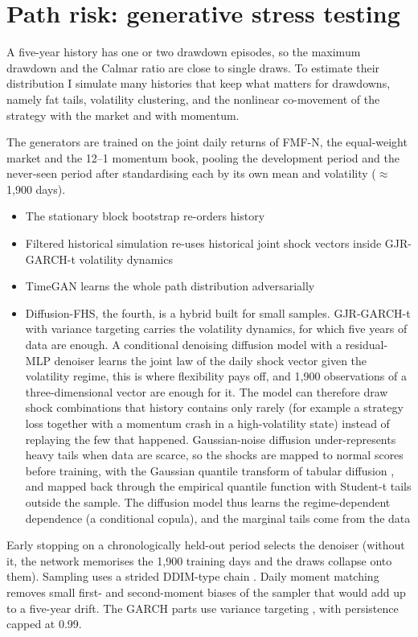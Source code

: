 \section{Path risk: generative stress testing}\label{sec:generative}

A five-year history has one or two drawdown episodes, so the maximum drawdown and the Calmar ratio are close to single draws. To estimate their distribution I simulate many histories that keep what matters for drawdowns, namely fat tails, volatility clustering, and the nonlinear co-movement of the strategy with the market and with momentum.

 The generators are trained on the joint daily returns of FMF-N, the equal-weight market and the 12--1 momentum book, pooling the development period and the never-seen period after standardising each by its own mean and volatility ($\approx$1,900 days).
\begin{itemize}
  \item The stationary block bootstrap \citep{politis1994} re-orders history
  \item Filtered historical simulation \citep{baroneadesi1999} re-uses historical joint shock vectors inside GJR-GARCH-t volatility dynamics
  \item TimeGAN \citep{yoon2019} learns the whole path distribution adversarially
  \item Diffusion-FHS, the fourth, is a hybrid built for small samples. GJR-GARCH-t with variance targeting carries the volatility dynamics, for which five years of data are enough. A conditional denoising diffusion model \citep{ho2020} with a residual-MLP denoiser learns the joint law of the daily shock vector given the volatility regime, this is where flexibility pays off, and 1,900 observations of a three-dimensional vector are enough for it. The model can therefore draw shock combinations that history contains only rarely (for example a strategy loss together with a momentum crash in a high-volatility state) instead of replaying the few that happened. Gaussian-noise diffusion under-represents heavy tails when data are scarce, so the shocks are mapped to normal scores before training, with the Gaussian quantile transform of tabular diffusion \citep{kotelnikov2023}, and mapped back through the empirical quantile function with Student-t tails outside the sample. The diffusion model thus learns the regime-dependent dependence (a conditional copula), and the marginal tails come from the data
\end{itemize}
Early stopping on a chronologically held-out period selects the denoiser (without it, the network memorises the 1,900 training days and the draws collapse onto them). Sampling uses a strided DDIM-type chain \citep{song2021}. Daily moment matching \citep{boyle1997} removes small first- and second-moment biases of the sampler that would add up to a five-year drift. The GARCH parts use variance targeting \citep{engle1996}, with persistence capped at 0.99.

